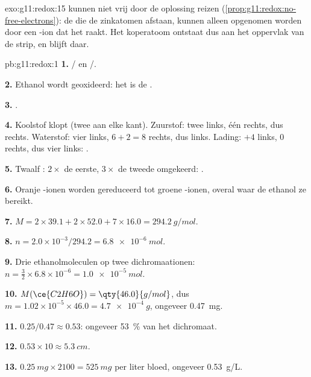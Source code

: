 \begin{solution}{exo:g11:redox:15}
 kunnen niet vrij door de oplossing reizen
(\cref{prop:g11:redox:no-free-electrons}): de  die de
zinkatomen afstaan, kunnen alleen opgenomen worden door een
-ion dat het  raakt. Het koperatoom ontstaat dus aan het
oppervlak van de strip, en blijft daar.
\end{solution}

\begin{solution}{pb:g11:redox:1}
\textbf{1.} / en /.

\textbf{2.} Ethanol wordt geoxideerd: het is de .

\textbf{3.} .

\textbf{4.} Koolstof klopt (twee aan elke kant). Zuurstof: twee links,
één rechts, dus  rechts. Waterstof: vier links, $6 + 2 = 8$
rechts, dus  links. Lading: $+4$ links, 0 rechts, dus vier
 links:
.

\textbf{5.} Twaalf : $2\times$ de eerste, $3\times$ de tweede
omgekeerd:
.

\textbf{6.} Oranje -ionen worden gereduceerd tot groene
-ionen, overal waar de ethanol ze bereikt.

\textbf{7.} $M = 2\times 39.1 + 2\times 52.0 + 7\times 16.0 =
\qty{294.2}{g/mol}$.

\textbf{8.} $n = 2.0\times 10^{-3}/294.2 = \qty{6.8e-6}{mol}$.

\textbf{9.} Drie ethanolmoleculen op twee dichromaationen:
$n = \tfrac{3}{2}\times 6.8\times 10^{-6} = \qty{1.0e-5}{mol}$.

\textbf{10.} $M(\ce{C2H6O}) = \qty{46.0}{g/mol}$, dus
$m = 1.02\times 10^{-5}\times 46.0 = \qty{4.7e-4}{g}$, ongeveer
\qty{0.47}{mg}.

\textbf{11.} $0.25/0.47 \approx 0.53$: ongeveer \qty{53}{\percent} van
het dichromaat.

\textbf{12.} $0.53 \times 10 \approx \qty{5.3}{cm}$.

\textbf{13.} $\qty{0.25}{mg} \times 2100 = \qty{525}{mg}$ per liter
bloed, ongeveer \qty{0.53}{g/L}.


\end{solution}
